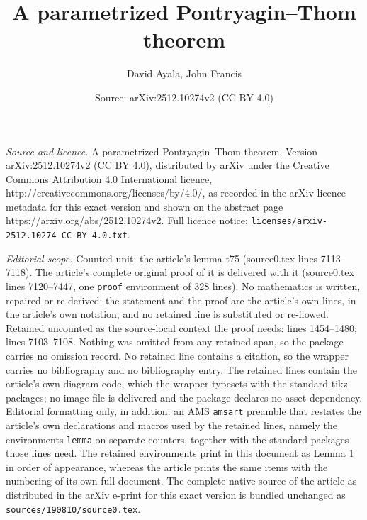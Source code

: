 \documentclass[10pt,a4paper]{amsart}
\title{A parametrized Pontryagin--Thom theorem}
\author{David Ayala, John Francis}
\date{Source: arXiv:2512.10274v2 (CC BY 4.0)}
\begin{document}
\maketitle

\noindent\emph{Source and licence.} A parametrized Pontryagin--Thom theorem. Version arXiv:2512.10274v2 (CC BY 4.0), distributed by arXiv under the Creative Commons Attribution 4.0 International licence, http://creativecommons.org/licenses/by/4.0/, as recorded in the arXiv licence metadata for this exact version and shown on the abstract page https://arxiv.org/abs/2512.10274v2. Full licence notice: \texttt{licenses/arxiv-2512.10274-CC-BY-4.0.txt}.\par\smallskip

\noindent\textit{Editorial scope.} Counted unit: the article's lemma t75 (source0.tex lines 7113--7118). The article's complete original proof of it is delivered with it (source0.tex lines 7120--7447, one \texttt{proof} environment of 328 lines). No mathematics is written, repaired or re-derived: the statement and the proof are the article's own lines, in the article's own notation, and no retained line is substituted or re-flowed.  Retained uncounted as the source-local context the proof needs: lines 1454--1480; lines 7103--7108.  Nothing was omitted from any retained span, so the package carries no omission record.  No retained line contains a citation, so the wrapper carries no bibliography and no bibliography entry.  The retained lines contain the article's own diagram code, which the wrapper typesets with the standard tikz packages; no image file is delivered and the package declares no asset dependency.  Editorial formatting only, in addition: an AMS \texttt{amsart} preamble that restates the article's own declarations and macros used by the retained lines, namely the environments \texttt{lemma} on separate counters, together with the standard packages those lines need.  The retained environments print in this document as Lemma 1 in order of appearance, whereas the article prints the same items with the numbering of its own full document.  The complete native source of the article as distributed in the arXiv e-print for this exact version is bundled unchanged as \texttt{sources/190810/source0.tex}.
\end{document}
